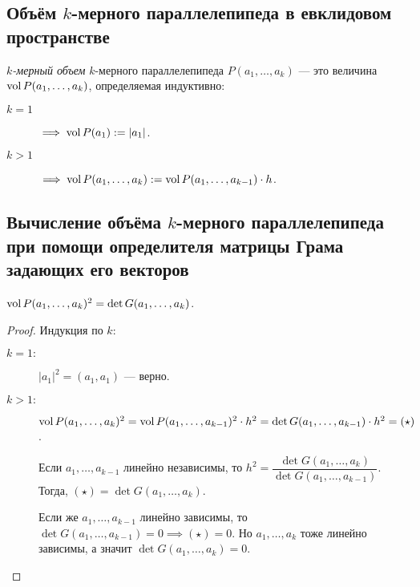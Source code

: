 \subsection{Объём $k$-мерного параллелепипеда в евклидовом пространстве}

\begin{definition}
    \textit{$k$-мерный объем} $k$-мерного параллелепипеда $P(a_1, \dots, a_k)$ --- это величина $\operatorname{\mathop{\mathrm{vol}}} P(a_1, \dots, a_k)$, определяемая индуктивно:

    \begin{description}
    \item[$k = 1$] $\implies \operatorname{\mathop{\mathrm{vol}}} P(a_1) := |a_1|$.
    \item[$k > 1$] $\implies \operatorname{\mathop{\mathrm{vol}}} P(a_1, \dots, a_k) := \operatorname{\mathop{\mathrm{vol}}} P(a_1, \dots, a_{k - 1}) \cdot h$.
    \end{description}
\end{definition}


\subsection{Вычисление объёма $k$-мерного параллелепипеда при помощи определителя матрицы Грама задающих его векторов}

\begin{theorem}
    $\operatorname{\mathop{\mathrm{vol}}} P(a_1, \dots, a_k)^2 = \det G(a_1, \dots, a_k)$.
\end{theorem}

\begin{proof}
    Индукция по $k$:

    \begin{description}
    \item[$k = 1:$] $|a_1|^2 = (a_1, a_1)$ --- верно.
    \item[$k > 1:$] $\operatorname{\mathop{\mathrm{vol}}} P(a_1, \dots, a_k)^2 = \operatorname{\mathop{\mathrm{vol}}} P(a_1, \dots, a_{k - 1})^2 \cdot h^2 = \det G(a_1, \dots, a_{k - 1}) \cdot h^2 = (\star)$.

        Если $a_1, \dots, a_{k - 1}$ линейно независимы, то $h^2 = \dfrac{\det G(a_1, \dots, a_k)}{\det G(a_1, \dots, a_{k - 1})}$.
        Тогда, $(\star) = \det G(a_1, \dots, a_k)$.

        Если же $a_1, \dots, a_{k - 1}$ линейно зависимы, то $\det G(a_1, \dots, a_{k - 1}) = 0 \implies (\star) = 0$. Но $a_1, \dots, a_k$ тоже линейно зависимы, а значит $\det G(a_1, \dots, a_k) = 0$.
        \qedhere
    \end{description}
\end{proof}

